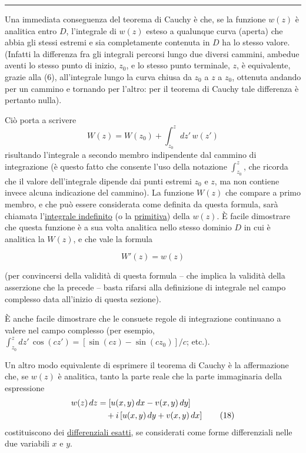 \documentclass[11pt, a4paper]{book}
\numberwithin{equation}{section}
\begin{document}
\medskip\hrule\medskip

Una immediata conseguenza del teorema di Cauchy è che, se la funzione $w(z)$ è analitica entro $D$, l'integrale di $w(z)$ esteso a qualunque curva (aperta) che abbia gli stessi estremi e sia completamente contenuta in $D$ ha lo stesso valore. (Infatti la differenza fra gli integrali percorsi lungo due diversi cammini, ambedue aventi lo stesso punto di inizio, $z_0$, e lo stesso punto terminale, $z$, è equivalente, grazie alla (6), all'integrale lungo la curva chiusa da $z_0$ a $z$ a $z_0$, ottenuta andando per un cammino e tornando per l'altro: per il teorema di Cauchy tale differenza è pertanto nulla).

Ciò porta a scrivere
\begin{equation}
W(z) = W(z_0) + \int_{z_0}^{z} dz'\, w(z') \tag{16}
\end{equation}
risultando l'integrale a secondo membro indipendente dal cammino di integrazione (è questo fatto che consente l'uso della notazione $\int_{z_0}^{z}$, che ricorda che il valore dell'integrale dipende dai punti estremi $z_0$ e $z$, ma non contiene invece alcuna indicazione del cammino). La funzione $W(z)$ che compare a primo membro, e che può essere considerata come definita da questa formula, sarà chiamata l'\uline{integrale indefinito} (o la \uline{primitiva}) della $w(z)$. È facile dimostrare che questa funzione è a sua volta analitica nello stesso dominio $D$ in cui è analitica la $W(z)$, e che vale la formula

\begin{equation}
W'(z) = w(z) \tag{17}
\end{equation}

(per convincersi della validità di questa formula -- che implica la validità della asserzione che la precede -- basta rifarsi alla definizione di integrale nel campo complesso data all'inizio di questa sezione).

È anche facile dimostrare che le consuete regole di integrazione continuano a valere nel campo complesso (per esempio, $\int_{z_0}^{z} dz'\, \cos(cz') = \left[\sin(cz) - \sin(cz_0)\right]/c$; etc.).

Un altro modo equivalente di esprimere il teorema di Cauchy è la affermazione che, se $w(z)$ è analitica, tanto la parte reale che la parte immaginaria della espressione
\begin{align}
w(z)\, dz &= \left[u(x,y)\, dx - v(x,y)\, dy\right] \notag \\
&\quad + i\left[u(x,y)\, dy + v(x,y)\, dx\right] \tag{18}
\end{align}
costituiscono dei \uline{differenziali esatti}, se considerati come forme differenziali nelle due variabili $x$ e $y$.
\end{document}
